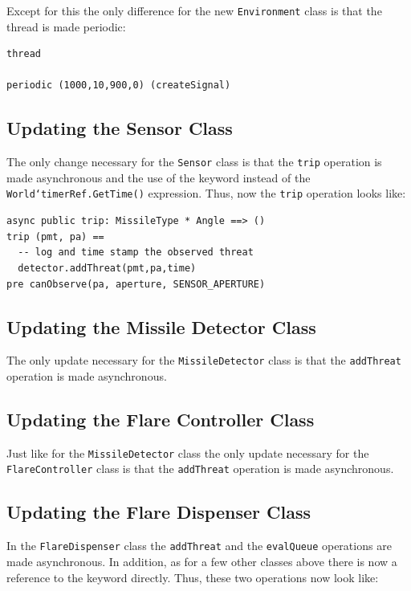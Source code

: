 \documentclass{overturerepchap}
\begin{document}
Except for this the only difference for the new \texttt{Environment} class
is that the thread is made periodic:

\begin{lstlisting}
thread

periodic (1000,10,900,0) (createSignal)
\end{lstlisting}

\subsection{Updating the Sensor Class}

The only change necessary for the \texttt{Sensor} class is that the 
\texttt{trip} operation is made asynchronous and the use of the 
{\bf{}} keyword instead of the \texttt{World`timerRef.GetTime()} 
expression. Thus, now the \texttt{trip} operation looks like:

\begin{lstlisting}
async public trip: MissileType * Angle ==> ()
trip (pmt, pa) ==
  -- log and time stamp the observed threat
  detector.addThreat(pmt,pa,time)
pre canObserve(pa, aperture, SENSOR_APERTURE)
\end{lstlisting}

\subsection{Updating the Missile Detector Class}

The only update necessary for the \texttt{MissileDetector} class is that
the \texttt{addThreat} operation is made asynchronous.

\subsection{Updating the Flare Controller Class}

Just like for the \texttt{MissileDetector} class the only update
necessary for the \texttt{FlareController} class is that the
\texttt{addThreat} operation is made asynchronous.

\subsection{Updating the Flare Dispenser Class}

In the \texttt{FlareDispenser} class the \texttt{addThreat} and the 
\texttt{evalQueue} operations are made asynchronous. In addition, as
for a few other classes above there is now a reference to the 
{\bf{}} keyword directly. Thus, these two operations now look
like:
\end{document}
